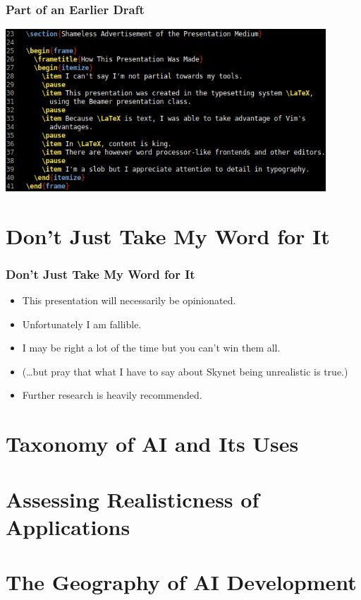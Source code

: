 \documentclass{beamer}
\begin{document}
  \begin{frame}
    \frametitle{Part of an Earlier Draft}
    \begin{center}
      \includegraphics[width=0.9\textwidth]{latex-section-and-frame.png}
    \end{center}
  \end{frame}

  \section{Don't Just Take My Word for It}

  \begin{frame}
    \frametitle{Don't Just Take My Word for It}

    \begin{itemize}
      \item This presentation will necessarily be opinionated.
      \pause
      \item Unfortunately I am fallible.
      \pause
      \item I may be right a lot of the time but you can't win them all.
      \pause
      \item (\ldots{}but pray that what I have to say about Skynet being
        unrealistic is true.)
      \pause
      \item Further research is heavily recommended.
    \end{itemize}
  \end{frame}

  \section{Taxonomy of AI and Its Uses}
  \section{Assessing Realisticness of Applications}
  \section{The Geography of AI Development}
\end{document}
